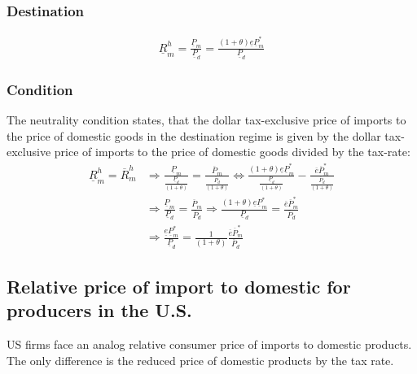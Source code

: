 \subsubsection*{Destination}
\begin{equation}\label{mcon.d}
\begin{aligned}
\underline R^h_m = \frac{\underline P_m}{\underline P_d} = \frac{ \left( 1 + \theta \right) \underline e \underline P^*_m}{\underline P_d}
\end{aligned} 
\end{equation}

\subsubsection*{Condition}
The neutrality condition states, that the dollar tax-exclusive price of imports to the price of domestic goods in the destination regime is given by the dollar tax-exclusive price of imports to the price of domestic goods divided by the tax-rate:
\begin{equation}\label{mcon.con}
\begin{aligned}
\underline R^h_m = \overline R^h_m &\Rightarrow \frac{\underline P_m}{\frac{\underline P_d}{ \left( 1+\theta \right) }} = \frac{\overline P_m}{\frac{\overline P_d}{ \left( 1+\theta \right) }} \Leftrightarrow \frac{ \left( 1+\theta \right) \underline e \underline P^*_m}{\frac{\underline P_d}{ \left( 1+\theta \right) }} - \frac{\overline e \overline P^*_m}{\frac{\overline P_d}{ \left( 1+\theta \right) }} \\ &\Rightarrow \frac{\underline P_m}{\underline P_d} = \frac{\overline P_m}{\overline P_d} \Rightarrow \frac{ \left( 1+\theta \right) \underline e \underline P^*_m}{{\underline P_d}} = \frac{\overline e \overline P^*_m}{\overline P_d}  \\ &\Rightarrow \frac{\underline e \underline P^*_m}{{\underline P_d}} = \frac{1}{ \left( 1+\theta \right) } \frac{\overline e \overline P^*_m}{\overline P_d}
\end{aligned} 
\end{equation}


\subsection*{Relative price of import to domestic for producers in the U.S.}
US firms face an analog relative consumer price of imports to domestic products. The only difference is the reduced price of domestic products by the tax rate.

